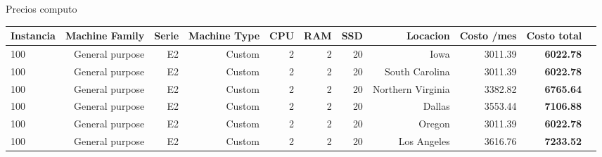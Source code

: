 \documentclass{article}
\begin{document}
\begin{adjustwidth}{-2.5 cm}{-2.5 cm}\centering\begin{threeparttable}[!htb]
    \centering
\caption{Precios computo}\label{tab: }
\scriptsize
\begin{tabular}{lrrrrrrrrrr}\toprule
\cellcolor[HTML]{f1c232}Instancia &\cellcolor[HTML]{f1c232}Machine Family &\cellcolor[HTML]{f1c232}Serie &\cellcolor[HTML]{f1c232}Machine Type &\cellcolor[HTML]{f1c232}CPU &\cellcolor[HTML]{f1c232}RAM &\cellcolor[HTML]{f1c232}SSD &\cellcolor[HTML]{f1c232}Locacion &\cellcolor[HTML]{f1c232}Costo /mes &\cellcolor[HTML]{f1c232}Costo total \\\midrule
\cellcolor[HTML]{ffd966}100 &\cellcolor[HTML]{ffd966}General purpose &\cellcolor[HTML]{ffd966}E2 &\cellcolor[HTML]{ffd966}Custom &\cellcolor[HTML]{ffd966}2 &\cellcolor[HTML]{ffd966}2 &\cellcolor[HTML]{ffd966}20 &\cellcolor[HTML]{ffd966}Iowa &\cellcolor[HTML]{ffd966}3011.39 &\cellcolor[HTML]{ffff00}\textbf{6022.78} \\
\cellcolor[HTML]{ffd966}100 &\cellcolor[HTML]{ffd966}General purpose &\cellcolor[HTML]{ffd966}E2 &\cellcolor[HTML]{ffd966}Custom &\cellcolor[HTML]{ffd966}2 &\cellcolor[HTML]{ffd966}2 &\cellcolor[HTML]{ffd966}20 &\cellcolor[HTML]{ffd966}South Carolina &\cellcolor[HTML]{ffd966}3011.39 &\cellcolor[HTML]{ffff00}\textbf{6022.78} \\
\cellcolor[HTML]{ffd966}100 &\cellcolor[HTML]{ffd966}General purpose &\cellcolor[HTML]{ffd966}E2 &\cellcolor[HTML]{ffd966}Custom &\cellcolor[HTML]{ffd966}2 &\cellcolor[HTML]{ffd966}2 &\cellcolor[HTML]{ffd966}20 &\cellcolor[HTML]{ffd966}Northern Virginia &\cellcolor[HTML]{ffd966}3382.82 &\cellcolor[HTML]{ffd966}\textbf{6765.64} \\
\cellcolor[HTML]{ffd966}100 &\cellcolor[HTML]{ffd966}General purpose &\cellcolor[HTML]{ffd966}E2 &\cellcolor[HTML]{ffd966}Custom &\cellcolor[HTML]{ffd966}2 &\cellcolor[HTML]{ffd966}2 &\cellcolor[HTML]{ffd966}20 &\cellcolor[HTML]{ffd966}Dallas &\cellcolor[HTML]{ffd966}3553.44 &\cellcolor[HTML]{ffd966}\textbf{7106.88} \\
\cellcolor[HTML]{ffd966}100 &\cellcolor[HTML]{ffd966}General purpose &\cellcolor[HTML]{ffd966}E2 &\cellcolor[HTML]{ffd966}Custom &\cellcolor[HTML]{ffd966}2 &\cellcolor[HTML]{ffd966}2 &\cellcolor[HTML]{ffd966}20 &\cellcolor[HTML]{ffd966}Oregon &\cellcolor[HTML]{ffd966}3011.39 &\cellcolor[HTML]{ffff00}\textbf{6022.78} \\
\cellcolor[HTML]{ffd966}100 &\cellcolor[HTML]{ffd966}General purpose &\cellcolor[HTML]{ffd966}E2 &\cellcolor[HTML]{ffd966}Custom &\cellcolor[HTML]{ffd966}2 &\cellcolor[HTML]{ffd966}2 &\cellcolor[HTML]{ffd966}20 &\cellcolor[HTML]{ffd966}Los Angeles &\cellcolor[HTML]{ffd966}3616.76 &\cellcolor[HTML]{ffd966}\textbf{7233.52} \\

\end{tabular}
\end{threeparttable}
\end{adjustwidth}
\end{document}
